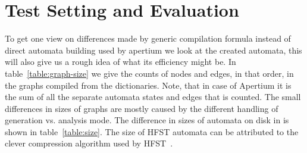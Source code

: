 \documentclass[10pt,a4paper]{article}
\begin{document}
\section{Test Setting and Evaluation}
\label{sec:evaluation}

%

To get one view on differences made by generic compilation formula instead of
direct automata building used by apertium we look at the created automata, this
will also give us a rough idea of what its efficiency might be. In
table~\ref{table:graph-size} we give the counts of nodes and edges, in that
order, in the graphs compiled from the dictionaries. Note, that in case
of Apertium it is the sum of all the separate automata states and edges that
is counted. The small differences in sizes of graphs are mostly caused by
the different handling of generation vs. analysis mode. The difference in sizes
of automata on disk in is shown in table~\ref{table:size}.
The size of HFST automata can be attributed to the clever compression
algorithm used by HFST~\cite{silfverberg/2009/fsmnlp}.
\end{document}
